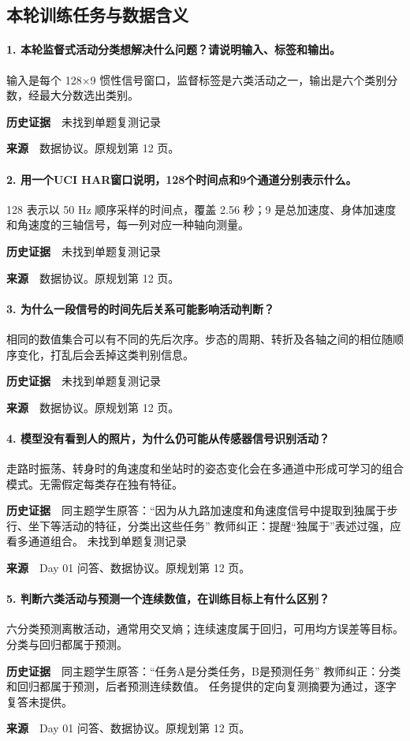 \clearpage\subsection{本轮训练任务与数据含义}
\paragraph{1. 本轮监督式活动分类想解决什么问题？请说明输入、标签和输出。}
输入是每个 128\(\times\)9 惯性信号窗口，监督标签是六类活动之一，输出是六个类别分数，经最大分数选出类别。\par
\textbf{历史证据}　未找到单题复测记录\par
\textbf{来源}　数据协议。原规划第 12 页。\par
\paragraph{2. 用一个UCI HAR窗口说明，128个时间点和9个通道分别表示什么。}
128 表示以 50 Hz 顺序采样的时间点，覆盖 2.56 秒；9 是总加速度、身体加速度和角速度的三轴信号，每一列对应一种轴向测量。\par
\textbf{历史证据}　未找到单题复测记录\par
\textbf{来源}　数据协议。原规划第 12 页。\par
\paragraph{3. 为什么一段信号的时间先后关系可能影响活动判断？}
相同的数值集合可以有不同的先后次序。步态的周期、转折及各轴之间的相位随顺序变化，打乱后会丢掉这类判别信息。\par
\textbf{历史证据}　未找到单题复测记录\par
\textbf{来源}　数据协议。原规划第 12 页。\par
\paragraph{4. 模型没有看到人的照片，为什么仍可能从传感器信号识别活动？}
走路时振荡、转身时的角速度和坐站时的姿态变化会在多通道中形成可学习的组合模式。无需假定每类存在独有特征。\par
\textbf{历史证据}　同主题学生原答：“因为从九路加速度和角速度信号中提取到独属于步行、坐下等活动的特征，分类出这些任务” 教师纠正：提醒“独属于”表述过强，应看多通道组合。 未找到单题复测记录\par
\textbf{来源}　Day 01 问答、数据协议。原规划第 12 页。\par
\paragraph{5. 判断六类活动与预测一个连续数值，在训练目标上有什么区别？}
六分类预测离散活动，通常用交叉熵；连续速度属于回归，可用均方误差等目标。分类与回归都属于预测。\par
\textbf{历史证据}　同主题学生原答：“任务A是分类任务，B是预测任务” 教师纠正：分类和回归都属于预测，后者预测连续数值。 任务提供的定向复测摘要为通过，逐字复答未提供。\par
\textbf{来源}　Day 01 问答、数据协议。原规划第 12 页。\par

